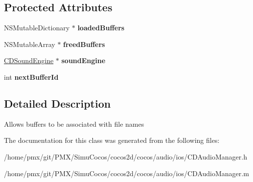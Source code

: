\subsection*{Protected Attributes}
\begin{DoxyCompactItemize}
\item 
\mbox{\label{interfaceCDBufferManager_a7aac798ae68b3b57ecef8e83b33a54be}} 
N\+S\+Mutable\+Dictionary $\ast$ {\bfseries loaded\+Buffers}
\item 
\mbox{\label{interfaceCDBufferManager_abb2dc124d1a30f3234ce34f0b51d75bb}} 
N\+S\+Mutable\+Array $\ast$ {\bfseries freed\+Buffers}
\item 
\mbox{\label{interfaceCDBufferManager_a8ff7a2838b6031a67351310c9a6f62c5}} 
\hyperlink{interfaceCDSoundEngine}{C\+D\+Sound\+Engine} $\ast$ {\bfseries sound\+Engine}
\item 
\mbox{\label{interfaceCDBufferManager_a092a00496df917e924a5b8399cf5aae5}} 
int {\bfseries next\+Buffer\+Id}
\end{DoxyCompactItemize}


\subsection{Detailed Description}
Allows buffers to be associated with file names 

The documentation for this class was generated from the following files\+:\begin{DoxyCompactItemize}
\item 
/home/pmx/git/\+P\+M\+X/\+Simu\+Cocos/cocos2d/cocos/audio/ios/C\+D\+Audio\+Manager.\+h\item 
/home/pmx/git/\+P\+M\+X/\+Simu\+Cocos/cocos2d/cocos/audio/ios/C\+D\+Audio\+Manager.\+m\end{DoxyCompactItemize}
